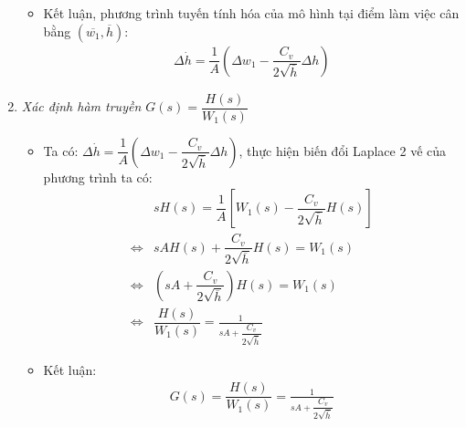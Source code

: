 \begin{enumerate}[\it a.]
\begin{itemize}
                \item Kết luận, phương trình tuyến tính hóa của mô hình tại điểm làm việc cân bằng $\left({\overline{w_1}, \overline{h}}\right)$:
                    \begin{align}
                        \Delta \dot{h} = \dfrac{1}{A} \left({\Delta w_1 - \dfrac{C_v}{2 \sqrt{\overline{h}}} \Delta h}\right)
                    \end{align}
            \end{itemize}

        \item \textit{Xác định hàm truyền $G(s) = \dfrac{H(s)}{W_1(s)}$}
            \begin{itemize}
                \item Ta có: $\Delta \dot{h} = \dfrac{1}{A} \left({\Delta w_1 - \dfrac{C_v}{2 \sqrt{\overline{h}}} \Delta h}\right)$, thực hiện biến đổi Laplace 2 vế của phương trình ta có:
                    \begin{align}
                        & s H(s) = \dfrac{1}{A} \left[{W_1(s) - \dfrac{C_v}{2 \sqrt{\overline{h}}} H(s)}\right]\\
                        \Longleftrightarrow & s A H(s) + \dfrac{C_v}{2 \sqrt{\overline{h}}} H(s) = W_1(s)\\
                        \Longleftrightarrow & \left({s A + \dfrac{C_v}{2 \sqrt{\overline{h}}}}\right) H(s) = W_1(s) \\
                        \Longleftrightarrow & \dfrac{H(s)}{W_1(s)} = \frac{1}{s A + \dfrac{C_v}{2 \sqrt{\overline{h}}}}
                    \end{align}

                \item Kết luận:
                    \begin{align}
                        G(s) = \dfrac{H(s)}{W_1(s)} = \frac{1}{s A + \dfrac{C_v}{2 \sqrt{\overline{h}}}}
                    \end{align}
            \end{itemize}
    \end{enumerate}

